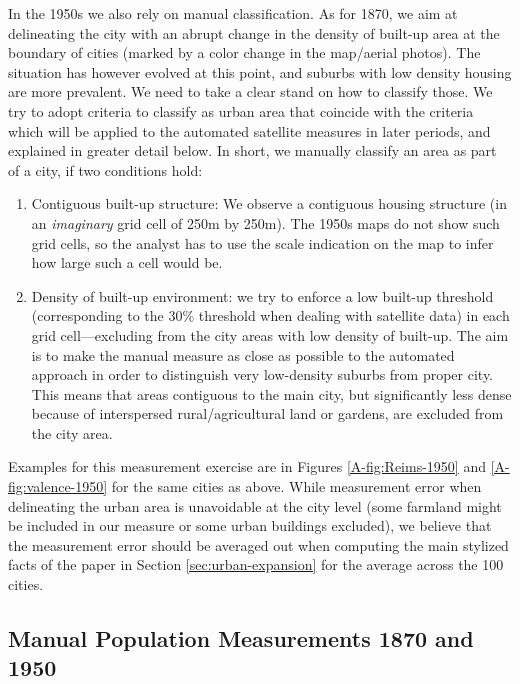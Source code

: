 \documentclass[11pt]{report}
\begin{document}
In the 1950s we also rely on manual classification. As for 1870, we aim at delineating the city with an abrupt change in the density of built-up area at the boundary of cities (marked by a color change in the map/aerial photos). The situation has however evolved at this point, and suburbs with low density housing are more prevalent. We need to take a clear stand on how to classify those. We try to adopt criteria to classify as urban area that coincide with the criteria which will be applied to the automated satellite measures in later periods, and explained in greater detail below. In short, we manually classify an area as part of a city, if two conditions hold:
\begin{enumerate}
	\item Contiguous built-up structure: We observe a contiguous housing structure (in an \emph{imaginary} grid cell of 250m by 250m). The 1950s maps do not show such grid cells, so the analyst has to use the scale indication on the map to infer how large such a cell would be.
	\item Density of built-up environment: we try to enforce a low built-up threshold (corresponding to the 30\% threshold when dealing with satellite data) in each grid cell---excluding from the city areas with low density of built-up. The aim is to make the manual measure as close as possible to the automated approach in order to distinguish very low-density suburbs from proper city. This means that areas contiguous to the main city, but significantly less dense because of interspersed rural/agricultural land or gardens, are excluded from the city area. 
\end{enumerate}

Examples for this measurement exercise are in Figures \ref{A-fig:Reims-1950} and \ref{A-fig:valence-1950} for the same cities as above. While measurement error when delineating the urban area is unavoidable at the city level (some farmland might be included in our measure or some urban buildings excluded), we believe that the measurement error should be averaged out when computing the main stylized facts of the paper in Section \ref{sec:urban-expansion} for the average across the 100 cities. 


\subsection{Manual Population Measurements 1870 and 1950}\label{A-sec:manual-pop}
\end{document}
